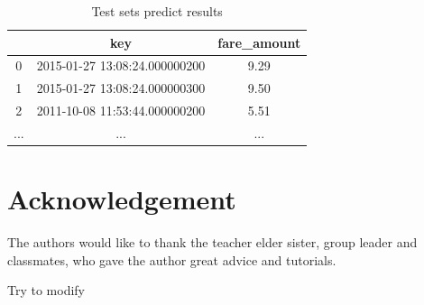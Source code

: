 \begin{table}[htbp]  
\centering
  \begin{center}
  \begin{tabular}{ccc}
\toprule
    & key & fare\_amount \\
\midrule
    0 & 2015-01-27 13:08:24.000000200 & 9.29 \\
    1 & 2015-01-27 13:08:24.000000300 & 9.50 \\
    2 & 2011-10-08 11:53:44.000000200 & 5.51 \\
    ... & ... &... \\
\bottomrule
\end{tabular}
\end{center}
\caption{Test sets predict results}
\end{table}









\newpage
\section*{Acknowledgement}


The authors would like to thank the teacher elder sister, group leader and classmates, who gave the author great advice and tutorials.

Try to modify
